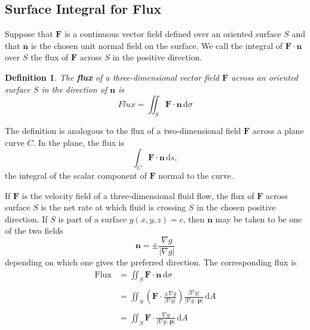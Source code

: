 \documentclass[a4paper,12pt]{article}
\newtheorem{definition}{Definition}
\begin{document}
\begin{CJK}{UTF8}{gbsn}
\subsection{Surface Integral for Flux}
Suppose that $\bm{F}$ is a continuous vector field defined over an 
oriented surface $S$ and that $\bm{n}$ is the chosen unit normal 
field on the surface. We call the integral of $\bm{F}\cdot\bm{n}$ 
over $S$ the flux of $\bm{F}$ across $S$ in the positive direction.
\begin{definition}
    The \textbf{flux} of a three-dimensional vector field $\bm{F}$ across 
    an oriented surface $S$ in the direction of $\bm{n}$ is 
    \[
        Flux = \iint_S \bm{F}\cdot \bm{n}\, \mathrm{d}\sigma
    \]
\end{definition}

The definition is analogous to the flux of a two-dimensional field 
$\bm{F}$ across a plane curve $C$. In the plane, the flux is 
\[
    \int_C \bm{F}\cdot\bm{n}\,\mathrm{d}s,
\]
the integral of the scalar component of $\bm{F}$ normal to the curve.

If $\bm{F}$ is the velocity field of a three-dimensional fluid flow,
the flux of $\bm{F}$ across surface $S$ is the net rate at which 
fluid is crossing $S$ in the chosen positive direction. If $S$ is part 
of a surface $g(x,y,z) = c$, then $\bm{n}$ may be taken to be one of 
the two fields 
\begin{equation}
    \bm{n} = \pm\frac{\nabla g}{\left|\nabla g \right|}
    \label{eq:eq11}
\end{equation}
depending on which one gives the preferred direction. The corresponding 
flux is 
\begin{equation}
    \begin{split}
        \textrm{Flux} & = \iint_S \bm{F}\cdot\bm{n}\, \mathrm{d}\sigma\\
        \\
        & = \iint_S \left(\bm{F}\cdot\frac{\pm\nabla g}{\left|\nabla g\right|}\right)
            \frac{\left|\nabla g\right|}{\left|\nabla g\cdot\bm{p}\right|}\,\mathrm{d}A\\ \\
        & = \iint_S \bm{F}\cdot\frac{\nabla g}{\left|\nabla g\cdot\bm{p}\right|}\,\mathrm{d}A
    \end{split}
\end{equation}


\end{CJK}
\end{document}
